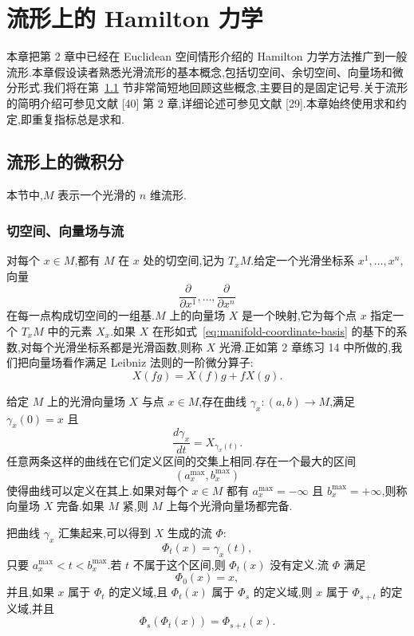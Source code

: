 \chapter{流形上的 Hamilton 力学}
\label{chap:hamiltonian-manifolds}

本章把第 2 章中已经在 Euclidean 空间情形介绍的 Hamilton 力学方法推广到一般流形.本章假设读者熟悉光滑流形的基本概念,包括切空间、余切空间、向量场和微分形式.我们将在第~\ref{sec:manifold-calculus} 节非常简短地回顾这些概念,主要目的是固定记号.关于流形的简明介绍可参见文献 [40] 第 2 章,详细论述可参见文献 [29].本章始终使用求和约定,即重复指标总是求和.

\section{流形上的微积分}
\label{sec:manifold-calculus}

本节中,$M$ 表示一个光滑的 $n$ 维流形.

\subsection{切空间、向量场与流}
\label{subsec:tangent-vector-fields-flows}

对每个 $x\in M$,都有 $M$ 在 $x$ 处的切空间,记为 $T_xM$.给定一个光滑坐标系 $x^1,\ldots,x^n$,向量
\[
 \frac{\partial}{\partial x^1},\ldots,
 \frac{\partial}{\partial x^n}\label{eq:manifold-coordinate-basis}
\]
在每一点构成切空间的一组基.$M$ 上的向量场 $X$ 是一个映射,它为每个点 $x$ 指定一个 $T_xM$ 中的元素 $X_x$.如果 $X$ 在形如式~\eqref{eq:manifold-coordinate-basis} 的基下的系数,对每个光滑坐标系都是光滑函数,则称 $X$ 光滑.正如第 2 章练习 14 中所做的,我们把向量场看作满足 Leibniz 法则的一阶微分算子:
\[
 X(fg)=X(f)g+fX(g).
\]

给定 $M$ 上的光滑向量场 $X$ 与点 $x\in M$,存在曲线 $\gamma_x:(a,b)\to M$,满足 $\gamma_x(0)=x$ 且
\[
 \frac{d\gamma_x}{dt}=X_{\gamma_x(t)}.
\]
任意两条这样的曲线在它们定义区间的交集上相同.存在一个最大的区间
\[
 (a_x^{\max},b_x^{\max})
\]
使得曲线可以定义在其上.如果对每个 $x\in M$ 都有 $a_x^{\max}=-\infty$ 且 $b_x^{\max}=+\infty$,则称向量场 $X$ 完备.如果 $M$ 紧,则 $M$ 上每个光滑向量场都完备.

把曲线 $\gamma_x$ 汇集起来,可以得到 $X$ 生成的流 $\Phi$:
\[
 \Phi_t(x)=\gamma_x(t),
\]
只要 $a_x^{\max}<t<b_x^{\max}$.若 $t$ 不属于这个区间,则 $\Phi_t(x)$ 没有定义.流 $\Phi$ 满足
\[
 \Phi_0(x)=x,\label{eq:flow-identity}
\]
并且,如果 $x$ 属于 $\Phi_t$ 的定义域,且 $\Phi_t(x)$ 属于 $\Phi_s$ 的定义域,则 $x$ 属于 $\Phi_{s+t}$ 的定义域,并且
\[
 \Phi_s(\Phi_t(x))=\Phi_{s+t}(x).\label{eq:flow-composition}
\]

